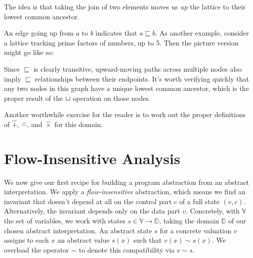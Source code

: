 \documentclass{amsbook}
\theoremstyle{definition}
\theoremstyle{remark}
\numberwithin{section}{chapter}
\numberwithin{equation}{chapter}
\begin{document}
The idea is that taking the join of two elements moves us \emph{up} the lattice to their lowest common ancestor.

An edge going up from $a$ to $b$ indicates that $a \sqsubseteq b$.
As another example, consider a lattice tracking prime factors of numbers, up to 5.
Then the picture version might go like so:

\begin{center}\end{center}

Since $\sqsubseteq$ is clearly transitive, upward-moving paths across multiple nodes also imply $\sqsubseteq$ relationships between their endpoints.
It's worth verifying quickly that any two nodes in this graph have a unique lowest common ancestor, which is the proper result of the $\sqcup$ operation on those nodes.

Another worthwhile exercise for the reader is to work out the proper definitions of $\hat{+}$, $\hat{-}$, and $\hat{\times}$ for this domain.


\section{Flow-Insensitive Analysis}

We now give our first recipe for building a program abstraction from an abstract interpretation.
We apply a \emph{flow-insensitive} abstraction, which means we find an invariant that doesn't depend at all on the control part $c$ of a full state $(v, c)$.
Alternatively, the invariant depends only on the data part $v$.
Concretely, with $\mathbb V$ the set of variables, we work with states $s \in \mathbb V \to \mathbb D$, taking the domain $\mathbb D$ of our chosen abstract interpretation.
An abstract state $s$ for a concrete valuation $v$ assigns to each $x$ an abstract value $s(x)$ such that $v(x) \sim s(x)$.
We overload the operator $\sim$ to denote this compatibility via $v \sim s$.
\end{document}
